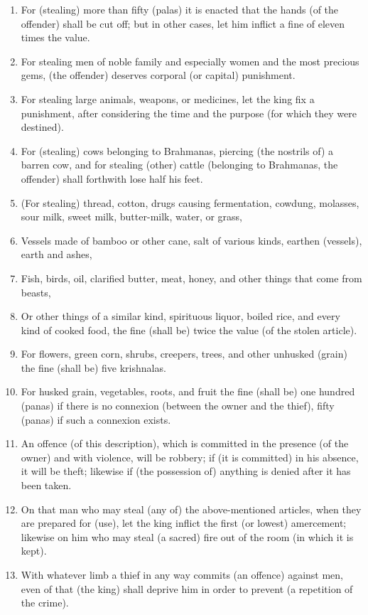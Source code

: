 \begin{enumerate}
\item For (stealing) more than fifty (palas) it is enacted that the hands (of the offender) shall be cut off; but in other cases, let him inflict a fine of eleven times the value.
\item For stealing men of noble family and especially women and the most precious gems, (the offender) deserves corporal (or capital) punishment.
\item For stealing large animals, weapons, or medicines, let the king fix a punishment, after considering the time and the purpose (for which they were destined).
\item For (stealing) cows belonging to Brahmanas, piercing (the nostrils of) a barren cow, and for stealing (other) cattle (belonging to Brahmanas, the offender) shall forthwith lose half his feet.
\item (For stealing) thread, cotton, drugs causing fermentation, cowdung, molasses, sour milk, sweet milk, butter-milk, water, or grass,
\item Vessels made of bamboo or other cane, salt of various kinds, earthen (vessels), earth and ashes,
\item Fish, birds, oil, clarified butter, meat, honey, and other things that come from beasts,
\item Or other things of a similar kind, spirituous liquor, boiled rice, and every kind of cooked food, the fine (shall be) twice the value (of the stolen article).
\item For flowers, green corn, shrubs, creepers, trees, and other unhusked (grain) the fine (shall be) five krishnalas.
\item For husked grain, vegetables, roots, and fruit the fine (shall be) one hundred (panas) if there is no connexion (between the owner and the thief), fifty (panas) if such a connexion exists.
\item An offence (of this description), which is committed in the presence (of the owner) and with violence, will be robbery; if (it is committed) in his absence, it will be theft; likewise if (the possession of) anything is denied after it has been taken.
\item On that man who may steal (any of) the above-mentioned articles, when they are prepared for (use), let the king inflict the first (or lowest) amercement; likewise on him who may steal (a sacred) fire out of the room (in which it is kept).
\item With whatever limb a thief in any way commits (an offence) against men, even of that (the king) shall deprive him in order to prevent (a repetition of the crime).

\end{enumerate}
